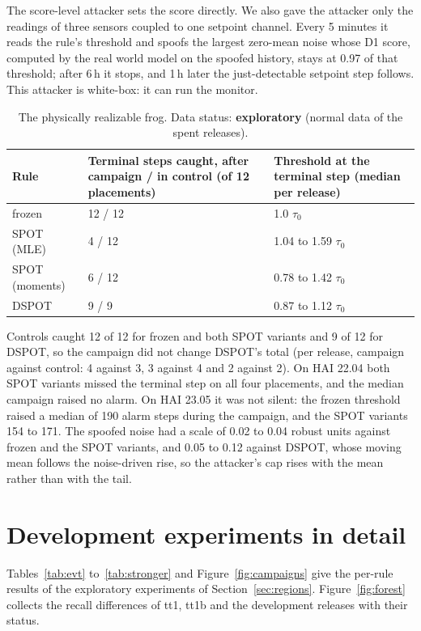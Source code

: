 \documentclass[sigconf]{acmart}
\begin{document}
The score-level attacker sets the score directly. We also gave the attacker only the readings of
three sensors coupled to one setpoint channel. Every 5 minutes it reads the rule's threshold and
spoofs the largest zero-mean noise whose D1 score, computed by the real world model on the spoofed
history, stays at 0.97 of that threshold; after 6\,h it stops, and 1\,h later the just-detectable
setpoint step follows. This attacker is white-box: it can run the monitor.

\begin{table}[t]
\caption{The physically realizable frog. Data status: \textbf{exploratory} (normal data of the spent
releases).}
\label{tab:physfrog}
\small
\begin{tabular}{@{}p{}p{}p{}@{}}
\toprule
Rule & Terminal steps caught, after campaign / in control (of 12 placements) & Threshold at the terminal step (median per release) \\
\midrule
frozen & 12 / 12 & 1.0 $\tau_0$ \\
SPOT (MLE) & 4 / 12 & 1.04 to 1.59 $\tau_0$ \\
SPOT (moments) & 6 / 12 & 0.78 to 1.42 $\tau_0$ \\
DSPOT & 9 / 9 & 0.87 to 1.12 $\tau_0$ \\
\bottomrule
\end{tabular}
\end{table}

Controls caught 12 of 12 for frozen and both SPOT variants and 9 of 12 for DSPOT, so the campaign did not change DSPOT's total (per release, campaign against control: 4 against 3, 3 against 4 and 2 against 2). On HAI 22.04 both SPOT variants missed the terminal step on all four placements, and the median campaign raised no alarm. On HAI 23.05 it was not silent: the frozen threshold raised a median of
190 alarm steps during the campaign, and the SPOT variants 154 to 171. The
spoofed noise had a scale of 0.02 to 0.04 robust units against frozen and the SPOT variants, and 0.05
to 0.12 against DSPOT, whose moving mean follows the noise-driven rise, so the attacker's cap rises
with the mean rather than with the tail.

\section{Development experiments in detail}
\label{app:dev}

Tables~\ref{tab:evt} to~\ref{tab:stronger} and Figure~\ref{fig:campaigns} give the per-rule results of
the exploratory experiments of Section~\ref{sec:regions}. Figure~\ref{fig:forest} collects the recall differences of tt1, tt1b and
the development releases with their status.
\end{document}
